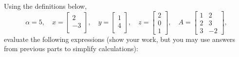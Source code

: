 \documentclass{article}
\def\blu#1{{\color{blu}#1}}
\begin{document}
\noindent Using the definitions below,
\[
\alpha = 5,\quad
x = \left[\begin{array}{c}
2\\
-3\\
\end{array}\right], \quad
y = \left[\begin{array}{c}
1\\
4\\
\end{array}\right],\quad
z = \left[\begin{array}{c}
2\\
0\\
1\end{array}\right],
\quad
A = \left[\begin{array}{cc}
1 & 2\\
2 & 3\\
3 & -2
\end{array}\right],
\]
\blu{evaluate the following expressions} (show your work, but you may use answers from previous parts to simplify calculations):\\
\end{document}

